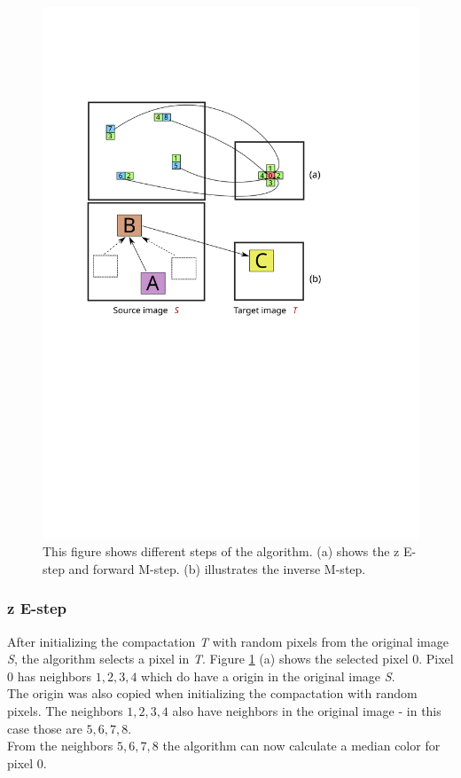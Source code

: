 \begin{figure}[h]
\centering
\includegraphics[scale=0.75]{img/its-algo}
\caption[Inverse texture synthesis algortihm]{This figure shows different steps of the algorithm. (a) shows the z E-step and forward M-step. (b) illustrates the inverse M-step.}
\label{fig:Inverse texture synthesis algortihm}
\end{figure}

\subsubsection{z E-step}
After initializing the compactation \textit{T} with random pixels from the original image \textit{S}, the algorithm selects a pixel in \textit{T}.
Figure \ref{fig:Inverse texture synthesis algortihm} (a) shows the selected pixel $0$. Pixel $0$ has neighbors ${1,2,3,4}$ which do have a origin in the original image \textit{S}.\\
The origin was also copied when initializing the compactation with random pixels. The neighbors ${1,2,3,4}$  also have neighbors in the original image - in this case those are ${5,6,7,8}$.\\
From the neighbors ${5,6,7,8}$ the algorithm can now calculate a median color for pixel $0$.

